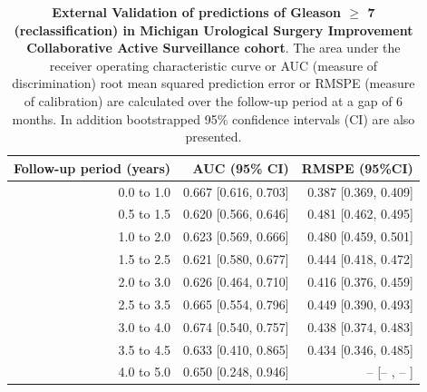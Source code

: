 \begin{table}[!htb]
\small\sf\centering
\caption{\textbf{External Validation of predictions of Gleason $\geq$ 7 (reclassification) in Michigan Urological Surgery Improvement Collaborative Active Surveillance cohort}. The area under the receiver operating characteristic curve or AUC (measure of discrimination) root mean squared prediction error or RMSPE (measure of calibration) are calculated over the follow-up period at a gap of 6 months. In addition bootstrapped 95\% confidence intervals (CI) are also presented.}
\label{tab:AUC_PE_MUSIC}
\begin{tabular}{r|r|r}
\hline
\hline
Follow-up period (years) & AUC (95\% CI) & RMSPE (95\%CI)\\ 
\hline
0.0 to 1.0 & 0.667 [0.616, 0.703] & 0.387 [0.369, 0.409]\\
0.5 to 1.5 & 0.620 [0.566, 0.646] & 0.481 [0.462, 0.495]\\
1.0 to 2.0 & 0.623 [0.569, 0.666] & 0.480 [0.459, 0.501]\\
1.5 to 2.5 & 0.621 [0.580, 0.677] & 0.444 [0.418, 0.472]\\
2.0 to 3.0 & 0.626 [0.464, 0.710] & 0.416 [0.376, 0.459]\\
2.5 to 3.5 & 0.665 [0.554, 0.796] & 0.449 [0.390, 0.493]\\
3.0 to 4.0 & 0.674 [0.540, 0.757] & 0.438 [0.374, 0.483]\\
3.5 to 4.5 & 0.633 [0.410, 0.865] & 0.434 [0.346, 0.485]\\
4.0 to 5.0 & 0.650 [0.248, 0.946] & --    [--   , --   ]\\
\hline
\end{tabular}	
\end{table}